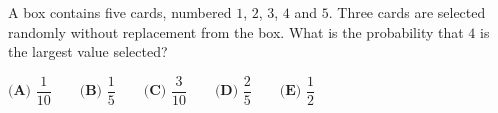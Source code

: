 A box contains five cards, numbered $1$, $2$, $3$, $4$ and $5$. Three cards are selected randomly without replacement from the box. What is the probability that $4$ is the largest value selected?

$\textbf{(A) }\dfrac{1}{10}\qquad\textbf{(B) }\dfrac{1}{5}\qquad\textbf{(C) }\dfrac{3}{10}\qquad\textbf{(D) }\dfrac{2}{5}\qquad\textbf{(E) }\dfrac{1}{2}$
